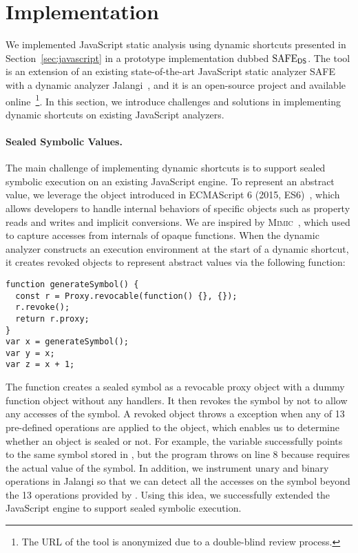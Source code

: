 \section{Implementation}\label{sec:implementation}
We implemented JavaScript static analysis using dynamic shortcuts
presented in Section~\ref{sec:javascript} in a prototype implementation dubbed
$\text{SAFE}_{\textsf{DS}}$.  The tool is an extension of an existing state-of-the-art JavaScript
static analyzer SAFE~\cite{safe, safe2} with a dynamic analyzer
Jalangi~\cite{jalangi}, and it is an open-source project and available online~\footnote{The
URL of the tool is anonymized due to a double-blind review process.}.  In this
section, we introduce challenges and solutions in implementing dynamic
shortcuts on existing JavaScript analyzers.

\paragraph{Sealed Symbolic Values.}
The main challenge of implementing dynamic shortcuts is to support sealed
symbolic execution on an existing JavaScript engine.  To represent an abstract
value, we leverage the  object introduced in ECMAScript 6
(2015, ES6)~\cite{es6}, which allows developers to handle internal behaviors
of specific objects such as property reads and writes and implicit conversions.
We are inspired by \textsc{Mimic}~\cite{mimic}, which used  to
capture accesses from internals of opaque functions.  When the dynamic analyzer
constructs an execution environment at the start of a dynamic shortcut, it
creates revoked  objects to represent abstract values via the
following  function:
\begin{lstlisting}[style=myJSstyle]
function generateSymbol() {
  const r = Proxy.revocable(function() {}, {});
  r.revoke();
  return r.proxy;
}
var x = generateSymbol();
var y = x;
var z = x + 1;
\end{lstlisting}
The function creates a sealed symbol  as a revocable proxy object with a dummy
function object without any handlers. It then revokes the symbol by
 not to allow any accesses of the symbol.  A revoked
object throws a  exception when any of 13 pre-defined operations
are applied to the object, which enables us to determine whether an
object is sealed or not.  For example, the variable
 successfully points to the same symbol stored in , but the
program throws  on line 8 because  requires
the actual value of the symbol.  In addition, we instrument unary and binary
operations in Jalangi so that we can detect all the accesses on the
symbol beyond the 13 operations provided by .
Using this idea, we successfully extended the
JavaScript engine to support sealed symbolic execution.


